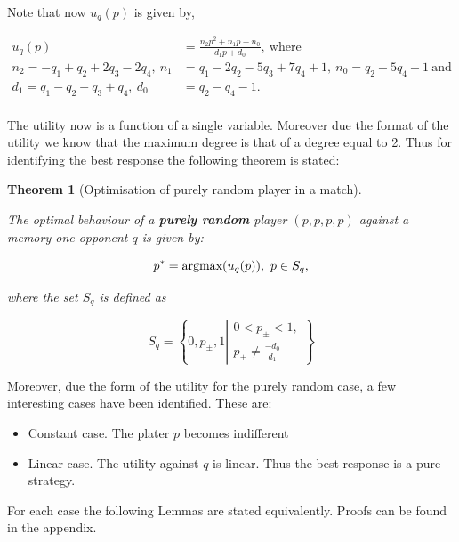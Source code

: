 \documentclass[10pt]{article}
\newtheorem{theorem}{Theorem}
\begin{document}
Note that now \(u_q(p)\) is given by,

\begin{equation}\label{eq:random_utility}
    \begin{aligned}
    u_q(p) & = \frac{n_2p^2 + n_1p +n_0 } {d_1p + d_0}, \ \text{where} \\
    n_2 =  - q_{1} + q_{2} + 2 q_{3} - 2 q_{4},\ n_1 & =  q_{1} - 2 q_{2} - 5 q_{3} + 7 q_{4} + 1, \ n_0 =  q_{2} - 5 q_{4} - 1 \ \text{and}\\
    d_1 =  q_{1} - q_{2} - q_{3} + q_{4},\ d_0 & =  q_{2} - q_{4} - 1. \\
    \end{aligned}
\end{equation}

The utility now is a function of a single variable. Moreover due the format of the
utility we know that the maximum degree is that of a degree equal to 2. Thus
for identifying the best response the following theorem is stated:

\begin{theorem}[Optimisation of purely random player in a match]
\label{theorem:random_optimisation_match}

    The optimal behaviour of a \textbf{purely random} player \((p, p, p, p)\)
    against a memory one opponent \(q\) is given by:

    \[p^* = \textnormal{argmax}(u_q(p)), \ p \in S_q,\]

    where the set \(S_q\) is defined as

    \[S_q = \left \{0, p_{\pm}, 1 \left |
        \begin{array}{l} 0 < p_{\pm} < 1, \\ p_{\pm} \neq \frac{-d_0}{d_1}
        \end{array} \right. \right\}\]
\end{theorem}

Moreover, due the form of the utility for the purely random case, a few interesting cases
have been identified. These are:

\begin{itemize}
    \item Constant case. The plater \(p\) becomes indifferent
    \item Linear case. The utility against \(q\) is linear. Thus the best
    response is a pure strategy.
\end{itemize}

For each case the following Lemmas are stated equivalently. Proofs can be
found in the appendix.
\end{document}
